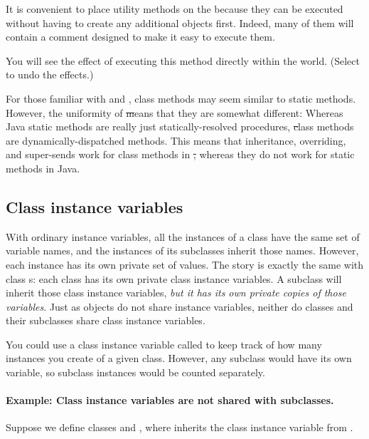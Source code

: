 \documentclass[a4paper,10pt,twoside]{book}
\begin{document}
It is convenient to place utility methods on the  because they can be executed without having to create any additional objects first.
Indeed, many of them will contain a comment designed to make it easy to execute them.

You will see the effect of executing this method directly within the world.
(Select  to undo the effects.)

For those familiar with  and , class methods may seem similar to static methods.
However, the uniformity of \st means that they are somewhat different:
Whereas Java static methods are really just statically-resolved procedures, \st class methods are dynamically-dispatched methods.
This means that inheritance, overriding, and super-sends work for class methods in \st, whereas they do not work for static methods in Java.

\subsection{Class instance variables}
With ordinary instance variables, all the instances of a class have the same set of variable names, and the instances of its subclasses inherit those names.
However, each instance has its own private set of values.
The story is exactly the same with class s: each class has its own private class instance variables.
A subclass will inherit those class instance variables, \emph{but it has its own private copies of those variables}.
Just as objects do not share instance variables, neither do classes and their subclasses share class instance variables.

You could use a class instance variable called  to keep track of how many instances you create of a given class.
However, any subclass would have its own  variable, so subclass instances would be counted separately.

\paragraph{Example: Class instance variables are not shared with subclasses.}
Suppose we define classes  and , where  inherits the class instance variable  from .
\end{document}
